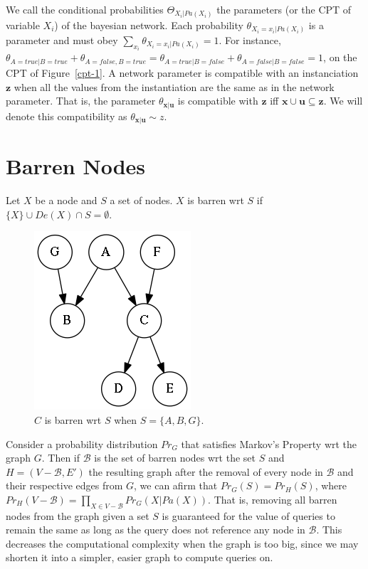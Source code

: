 \documentclass{amsart}
\theoremstyle{plain}
\begin{document}
We call the conditional probabilities $\Theta_{X_i|Pa(X_i)}$ the parameters (or the CPT of variable
$X_i$) of the bayesian network. Each probability $\theta_{X_i=x_i|Pa(X_i)}$ is a parameter and must
obey $\sum_{x_i} \theta_{X_i=x_i|Pa(X_i)} = 1$. For instance, $\theta_{A=true|B=true}+
\theta_{A=false,B=true}=\theta_{A=true|B=false}+\theta_{A=false|B=false}=1$, on the CPT of
Figure~\ref{cpt-1}. A network parameter is compatible with an instanciation $\mathbf{z}$ when all
the values from the instantiation are the same as in the network parameter. That is, the parameter
$\theta_{\mathbf{x}|\mathbf{u}}$ is compatible with $\mathbf{z}$ iff $\mathbf{x}\cup\mathbf{u}
\subseteq\mathbf{z}$. We will denote this compatibility as $\theta_{\mathbf{x}|\mathbf{u}}\sim z$.

\section{Barren Nodes}

Let $X$ be a node and $S$ a set of nodes. $X$ is barren wrt $S$ if $\{X\}\cup De(X)\cap
S=\emptyset$.

\begin{figure}[h]
  \captionsetup{justification=centering}
  \centering\includegraphics[scale=0.5]{graphs/barren.png}
  \caption{$C$ is barren wrt $S$ when $S=\{A,B,G\}$.}
\end{figure}

Consider a probability distribution $Pr_G$ that satisfies Markov's Property wrt the graph $G$. Then
if $\mathcal{B}$ is the set of barren nodes wrt the set $S$ and $H=(V-\mathcal{B},E')$ the
resulting graph after the removal of every node in $\mathcal{B}$ and their respective edges from
$G$, we can afirm that $Pr_G(S)=Pr_H(S)$, where $Pr_H(V-\mathcal{B})=\prod_{X\in V-\mathcal{B}}
Pr_G(X|Pa(X))$. That is, removing all barren nodes from the graph given a set $S$ is guaranteed for
the value of queries to remain the same as long as the query does not reference any node in
$\mathcal{B}$. This decreases the computational complexity when the graph is too big, since we may
shorten it into a simpler, easier graph to compute queries on.
\end{document}
